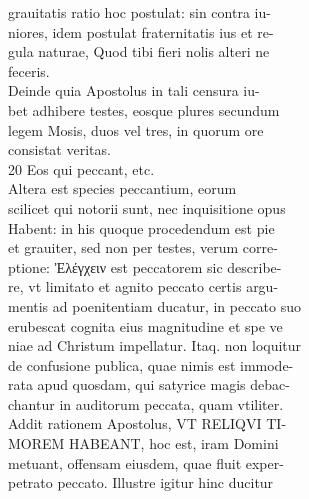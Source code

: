 \documentclass{article}
\begin{document}
\begin{pages}
                grauitatis ratio hoc postulat: sin contra iu- \\
                niores, idem postulat fraternitatis ius et re- \\
                gula naturae, Quod tibi fieri nolis alteri ne \\
                feceris. \\
                Deinde quia Apostolus in tali censura iu- \\
                bet adhibere testes, eosque plures secundum \\
                legem Mosis, duos vel tres, in quorum ore \\
                consistat veritas. \\
                20 Eos qui peccant, etc. \\
                Altera est species peccantium, eorum \\
                scilicet qui notorii sunt, nec inquisitione opus \\
                Habent: in his quoque procedendum est pie \\
                et grauiter, sed non per testes, verum corre- \\
                ptione: Ἐλέγχειν est peccatorem sic describe- \\
                re, vt limitato et agnito peccato certis argu- \\
                mentis ad poenitentiam ducatur, in peccato suo \\
                erubescat cognita eius magnitudine et spe ve \\
                niae ad Christum impellatur. Itaq. non loquitur \\
                de confusione publica, quae nimis est immode- \\
                rata apud quosdam, qui satyrice magis debac- \\
                chantur in auditorum peccata, quam vtiliter. \\
                Addit rationem Apostolus, VT RELIQVI TI- \\
                MOREM HABEANT, hoc est, iram Domini \\
                metuant, offensam eiusdem, quae fluit exper- \\
                petrato peccato. Illustre igitur hinc ducitur \\

\end{pages}
\end{document}
